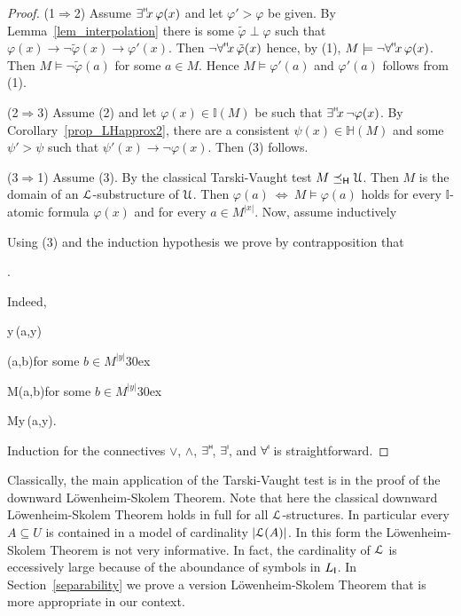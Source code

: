 \documentclass[10pt,oneside]{amsproc}
\begin{document}
\begin{proof}
  (1$\Rightarrow$2) Assume $\existsH x\,\varphi(x)$ and let $\varphi'>\varphi$ be given.
  By Lemma~\ref{lem_interpolation} there is some $\tilde{\varphi}\perp\varphi$ such that  $\varphi(x)\rightarrow\neg\tilde{\varphi}(x)\rightarrow\varphi'(x)$.
  Then $\neg\forallH x\,\tilde{\varphi}(x)$ hence, by (1), $M\models\neg\forallH x\,\varphi(x)$.
  Then $M\models\neg\tilde{\varphi}(a)$ for some $a\in M$. Hence $M\models\varphi'(a)$ and $\varphi'(a)$ follows from (1).

  (2$\Rightarrow$3)
  Assume (2) and let $\varphi(x)\in\mathds{I}(M)$ be such that $\existsH x\,\neg\varphi(x)$.
  By Corollary~\ref{prop_LHapprox2}, there are a consistent $\psi(x)\in\mathds{H}(M)$ and some $\psi'>\psi$ such that $\psi'(x)\rightarrow\neg\varphi(x)$.
  Then (3) follows.

  (3$\Rightarrow$1)
  Assume (3).
  By the classical Tarski-Vaught test $M\preceq_{\sf H}{\EuScript U}$.
  Then $M$ is the domain of an ${\EuScript L}$-substructure of ${\EuScript U}$.
  Then  $\varphi(a)\ \Leftrightarrow\ M\models\varphi(a)$ holds for every $\mathds{I}$-atomic formula $\varphi(x)$ and for every $a\in M^{|x|}$.
  Now, assume inductively
  

  Using (3) and the induction hypothesis we prove by contrapposition that

  .

  Indeed,

  {\Rightarrow}{\existsH y\,\neg\varphi(a,y)}
  
  \ceq{}
  {\Rightarrow}
  {\neg\varphi(a,b)}\hfill for some $b\in M^{|y|}$\kern30ex

  \ceq{}
  {\Rightarrow}
  {M\models\neg\varphi(a,b)}\hfill for some $b\in M^{|y|}$\kern30ex

  \ceq{}
  {\Rightarrow}
  {M\not\models\forallH y\,\varphi(a,y).}

  Induction for the connectives $\vee$, $\wedge$, $\existsH $, $\existsI $, and $\forallI $ is straightforward.
\end{proof}

Classically, the main application of the Tarski-Vaught test is in the proof of the downward L\"owenheim-Skolem Theorem.
Note that here the classical downward L\"owenheim-Skolem Theorem holds in full for all ${\EuScript L}$-structures.
In particular every $A\subseteq U$ is contained in a model of cardinality $|{\EuScript L}(A)|$.
In this form the L\"owenheim-Skolem Theorem is not very informative.
In fact, the cardinality of ${\EuScript L}$ is eccessively large because of the aboundance of symbols in $L_{\sf I}$.
In Section~\ref{separability} we prove a version L\"owenheim-Skolem Theorem that is more appropriate in our context.
\end{document}
